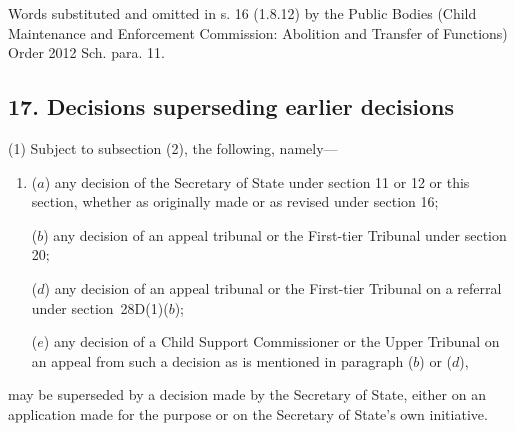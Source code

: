 \documentclass[12pt,a4paper]{article}
\begin{document}
{

Words substituted and omitted in s. 16 (1.8.12) by the Public Bodies (Child Maintenance and Enforcement
Commission: Abolition and Transfer of Functions) Order 2012 Sch. para. 11.

}

\subsection{17. Decisions superseding earlier decisions}

(1) Subject to subsection (2), the following, namely---
\begin{enumerate}\item[]
($a$) any decision of the Secretary of State under section 11 or 12 or this section,
whether as originally made or as revised under section 16;

($b$) any decision of 
an appeal tribunal or  %
the First-tier Tribunal under section 20;

($d$) any decision of 
an appeal tribunal or  %
the First-tier Tribunal on a referral under section~28D(1)($b$);

($e$) any decision of 
a Child Support Commissioner or  %
the Upper Tribunal on an appeal from such a decision as
is mentioned in paragraph ($b$) or ($d$),
\end{enumerate}
may be superseded by a decision made by the Secretary of State, either on an application made for the purpose or on the Secretary of State’s own initiative.

\end{document}
